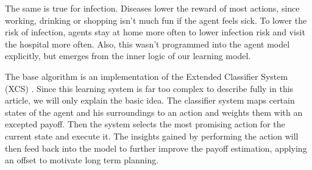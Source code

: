 \documentclass[table]{sig-alternate-05-2015}
\begin{document}
The same is true for infection. Diseases lower the reward of most actions, since working, drinking or shopping isn't much fun if the agent feels sick. To lower the risk of infection, agents stay at home more often to lower infection risk and visit the hospital more often. Also, this wasn't programmed into the agent model explicitly, but emerges from the inner logic of our learning model.

The base algorithm is an implementation of the Extended Classifier System (XCS) \cite{wilson1995classifier}. Since this learning system is far too complex to describe fully in this article, we will only explain the basic idea. The classifier system maps certain states of the agent and his surroundings to an action and weights them with an excepted payoff. Then the system selects the most promising action for the current state and execute it. The insights gained by performing the action will then feed back into the model to further improve the payoff estimation, applying an offset to motivate long term planning.
\end{document}
